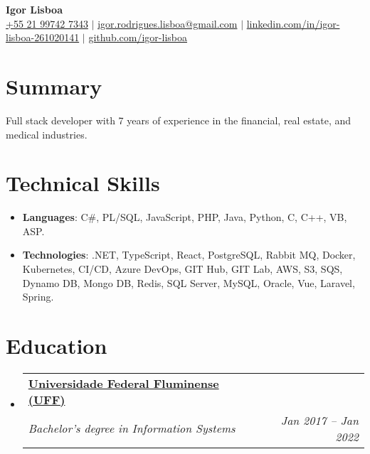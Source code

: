 \documentclass[letterpaper,10pt]{article}
\makeatletter
\newcommand{\resumeItem}[1]{\item\small{#1}}
\newcommand{\resumeSubheading}[4]{
\vspace{-1pt}\item
  \begin{tabular*}{0.97\textwidth}[t]{l@{\extracolsep{\fill}}r}
    \textbf{#1} & #2 \\
    \textit{#3} & \textit{#4} \\
  \end{tabular*}\vspace{-7pt}
}
\newcommand{\resumeSubHeadingList}{\begin{itemize}[leftmargin=0.15in, label={}]}
\newcommand{\resumeSubHeadingListEnd}{\end{itemize}}
\makeatother
\begin{document}
\begin{center}
  \textbf{\Huge Igor Lisboa} \\
  \small 
  \href{tel:+5521997427343}{+55 21 99742 7343} $|$ 
  \href{mailto:igor.rodrigues.lisboa@gmail.com}{igor.rodrigues.lisboa@gmail.com} $|$ 
  \href{https://linkedin.com/in/igor-lisboa-261020141}{linkedin.com/in/igor-lisboa-261020141} $|$
  \href{https://github.com/igor-lisboa}{github.com/igor-lisboa}
\end{center}

\section*{Summary}
Full stack developer with 7 years of experience in the financial, real estate, and medical industries.

\section{Technical Skills}
\resumeSubHeadingList
  \resumeItem{\textbf{Languages}: C\#, PL/SQL, JavaScript, PHP, Java, Python, C, C++, VB, ASP.}
  \resumeItem{\textbf{Technologies}: .NET, TypeScript, React, PostgreSQL, Rabbit MQ, Docker, Kubernetes, CI/CD, Azure DevOps, GIT Hub, GIT Lab, AWS, S3, SQS, Dynamo DB, Mongo DB, Redis, SQL Server, MySQL, Oracle, Vue, Laravel, Spring.}
\resumeSubHeadingListEnd

\section{Education}
\resumeSubHeadingList
  \resumeSubheading
      {\href{https://www.ic.uff.br/}{Universidade Federal Fluminense (UFF)}}{}
      {Bachelor's degree in Information Systems}{Jan 2017 -- Jan 2022}
\resumeSubHeadingListEnd
\end{document}
